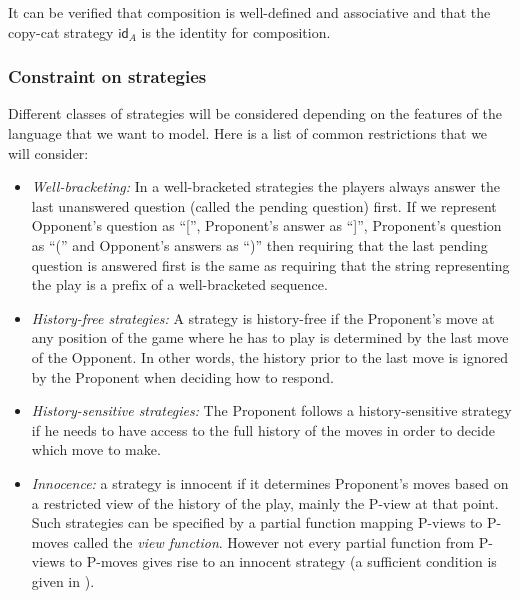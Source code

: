 It can be verified that composition is well-defined and associative
\citep{hylandong_pcf} and that the copy-cat strategy $\textsf{id}_A$ is the identity for composition.

\subsubsection{Constraint on strategies}

Different classes of strategies will be considered depending on the
features of the language that we want to model. Here is a list of
common restrictions that we will consider:
\begin{itemize}
\item \emph{Well-bracketing:} In a well-bracketed strategies the players always answer the last unanswered question (called the pending question) first.
If we represent Opponent's question as ``['', Proponent's answer as
``]'', Proponent's question as ``('' and Opponent's answers as ``)''
then requiring that the last pending question is answered first is
the same as requiring that the string representing the play is a
prefix of a well-bracketed sequence.

\item \emph{History-free strategies:} A strategy is history-free if the Proponent's move at any position of the game where he has to play
is determined by the last move of the Opponent. In other words, the
history prior to the last move is ignored by the Proponent when
deciding how to respond.

\item \emph{History-sensitive strategies:} The Proponent follows a history-sensitive strategy if he needs to have access to the full
history of the moves in order to decide which move to make.

\item \emph{Innocence:} a strategy is innocent if it determines Proponent's moves based on a restricted view of the history of the play, mainly the P-view
at that point. Such strategies can be specified by a partial
function mapping P-views to P-moves called the \emph{view function}. However not every partial
function from P-views to P-moves gives rise to an innocent strategy
(a sufficient condition is given in \cite{hylandong_pcf}).
\end{itemize}


